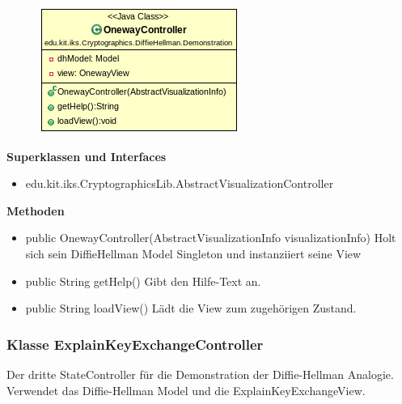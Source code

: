 \documentclass{article}
\begin{document}
      \begin{figure}[H]
        \centering
        \includegraphics[width=\textwidth]{resources/edu-kit-iks-Cryptographics-DiffieHellman-Demonstration-OnewayController}
      \end{figure}

      \textbf{Superklassen und Interfaces}
      \begin{itemize}
        \item edu.kit.iks.CryptographicsLib.AbstractVisualizationController
      \end{itemize}

      \textbf{Methoden}
      \begin{itemize}
          \item public OnewayController(AbstractVisualizationInfo visualizationInfo) \newline
              Holt sich sein DiffieHellman Model Singleton und instanziiert seine View
        \item public String getHelp() \newline
        Gibt den Hilfe-Text an.
        \item public String loadView() \newline
        Lädt die View zum zugehörigen Zustand.
      \end{itemize}

\subsubsection{Klasse ExplainKeyExchangeController}
      Der dritte StateController für die Demonstration der Diffie-Hellman Analogie.
      Verwendet das Diffie-Hellman Model und die ExplainKeyExchangeView.
\end{document}
